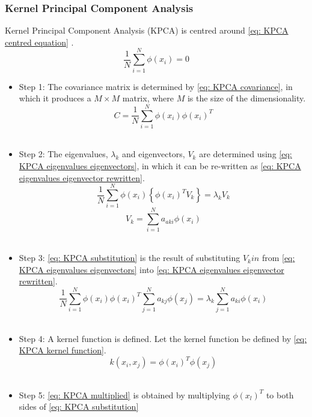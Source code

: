 \documentclass[11pt,twocolumn]{witseiepaper}
\begin{document}
	\subsubsection{Kernel Principal Component Analysis}
	Kernel Principal Component Analysis (KPCA) is centred around \eqref{eq: KPCA centred equation} \cite{Ibrahim_Baharudin2016}.
	\begin{equation}
		\label{eq: KPCA centred equation}
		\frac{1}{N}\sum_{i=1}^{N}\phi(x_i)=0
	\end{equation}
	\begin{itemize}
		\item Step 1: The covariance matrix is determined by \eqref{eq: KPCA covariance}, in which it produces a $M \times M$ matrix, where $M$ is the size of the dimensionality.
		\begin{equation}
			\label{eq: KPCA covariance}
			C = \frac{1}{N}\sum_{i=1}^{N}\phi(x_i)\phi(x_i)^T
		\end{equation} \\
		\item Step 2: The eigenvalues, $\lambda_k$ and eigenvectors, $V_k$ are determined using \eqref{eq: KPCA eigenvalues eigenvectors}, in which it can be re-written as \eqref{eq: KPCA eigenvalues eigenvector rewritten}.
		\begin{equation}
			\label{eq: KPCA eigenvalues eigenvectors}
			\frac{1}{N}\sum_{i=1}^{N}\phi(x_i)\left\{\phi(x_i)^TV_k\right\} = \lambda_k V_k
		\end{equation} 
		\begin{equation}
			\label{eq: KPCA eigenvalues eigenvector rewritten}
			V_k = \sum_{i=1}^{N}a_{aki}\phi(x_i)
		\end{equation} \\
		\item Step 3: \eqref{eq: KPCA substitution} is the result of substituting $V_kin$ from \eqref{eq: KPCA eigenvalues eigenvectors} into \eqref{eq: KPCA eigenvalues eigenvector rewritten}.
		\begin{equation}
			\label{eq: KPCA substitution}
			\frac{1}{N}\sum_{i=1}^{N}\phi(x_i)\phi(x_i)^T \sum_{j=1}^{N}a_{kj}\phi(x_j) = \lambda_{k}\sum_{j=1}^{N}a_{ki}\phi(x_i)
		\end{equation} \\
		\item Step 4: A kernel function is defined. Let the kernel function be defined by \eqref{eq: KPCA kernel function}.
		\begin{equation}
			\label{eq: KPCA kernel function}
			k(x_i, x_j) = \phi(x_i)^T\phi(x_j)
		\end{equation}\\
		\item Step 5: \eqref{eq: KPCA multiplied} is obtained by multiplying $\phi(x_l)^T$ to both sides of \eqref{eq: KPCA substitution}
	\end{itemize}
\end{document}
